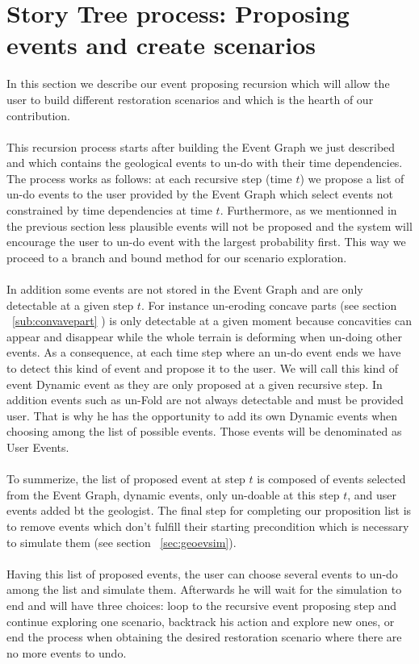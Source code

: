\documentclass[12pt, a4paper]{report} %
\begin{document}
\section{Story Tree process: Proposing events and create scenarios} 
\label{sec:storytree}
In this section we describe our event proposing recursion which will allow the user to build different restoration scenarios and which is the hearth of our contribution.\\\\
This recursion process starts after building the Event Graph we just described and which contains the geological events to un-do with their time dependencies. The process works as follows: at each recursive step (time $t$) we propose a list of un-do events to the user provided by the Event Graph which select events not constrained by time dependencies at time $t$. Furthermore, as we mentionned in the previous section less plausible events will not be proposed and the system will encourage the user to un-do event with the largest probability first. This way we proceed to a branch and bound method for our scenario exploration. \\\\
In addition some events are not stored in the Event Graph and are only detectable at a given step $t$. For instance un-eroding concave parts (see section ~\ref{sub:convavepart} ) is only detectable at a given moment because concavities can appear and disappear while the whole terrain is deforming when un-doing other events. As a consequence, at each time step where an un-do event ends we have to detect this kind of event and propose it to the user. We will call this kind of event Dynamic event as they are only proposed at a given recursive step. In addition events such as un-Fold are not always detectable and must be provided user. That is why he has the opportunity to add its own Dynamic events when choosing among the list of possible events. Those events will be denominated as User Events.\\\\
To summerize, the list of proposed event at step $t$ is composed of events selected from the Event Graph, dynamic events, only un-doable at this step $t$, and user events added bt the geologist. The final step for completing our proposition list is to remove events which don't fulfill their starting precondition which is necessary to simulate them (see section ~\ref{sec:geoevsim}).\\\\
Having this list of proposed events, the user can choose several events to un-do among the list and simulate them. Afterwards he will wait for the simulation to end and will have three choices: loop to the recursive event proposing step and continue exploring one scenario, backtrack his action and explore new ones, or end the process when obtaining the desired restoration scenario where there are no more events to undo.\\\\
\end{document}
